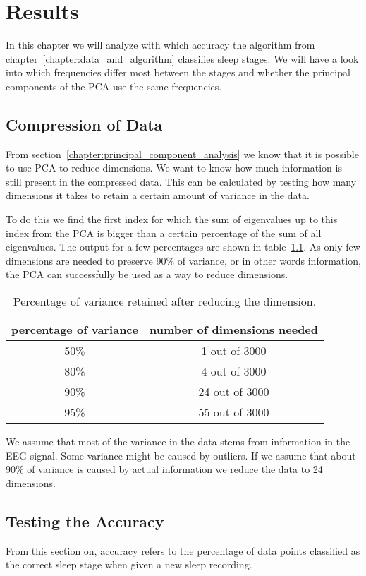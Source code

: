\chapter{Results}
\label{chapter:results}

In this chapter we will analyze with which accuracy the algorithm from chapter~\ref{chapter:data_and_algorithm} classifies sleep stages. We will have a look into which frequencies differ most between the stages and whether the principal components of the PCA use the same frequencies.

\section{Compression of Data}
From section~\ref{chapter:principal_component_analysis} we know that it is possible to use PCA to reduce dimensions. We want to know how much information is still present in the compressed data. This can be calculated by testing how many dimensions it takes to retain a certain amount of variance in the data.

To do this we find the first index for which the sum of eigenvalues up to this index from the PCA is bigger than a certain percentage of the sum of all eigenvalues. The output for a few percentages are shown in table~\ref{tab:explained_variance}. As only few dimensions are needed to preserve 90\% of variance, or in other words information, the PCA can successfully be used as a way to reduce dimensions.

\begin{table}
	\centering
	\begin{tabular}{c|c}
		percentage of variance & number of dimensions needed \\
		\hline
		50\% & 1 out of 3000 \\
		80\% & 4 out of 3000 \\
		90\% & 24 out of 3000 \\
		95\% & 55 out of 3000 \\
	\end{tabular}
	\caption{Percentage of variance retained after reducing the dimension.}
	\label{tab:explained_variance}
\end{table}

We assume that most of the variance in the data stems from information in the EEG signal. Some variance might be caused by outliers. If we assume that about 90\% of variance is caused by actual information we reduce the data to 24 dimensions.

\section{Testing the Accuracy}
From this section on, accuracy refers to the percentage of data points classified as the correct sleep stage when given a new sleep recording.

